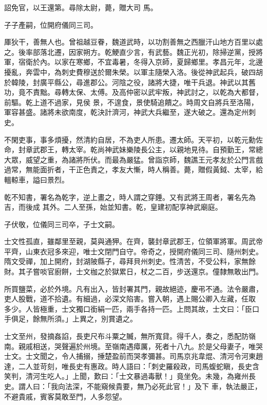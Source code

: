 \begin{pinyinscope}
 詔免官，以王還第。尋除太尉，薨，贈大司
 馬。



 子子產嗣，位開府儀同三司。



 厙狄干，善無人也。曾祖越豆眷，魏道武時，以功割善無之西臘汗山地方百里以處之。後率部落北遷，因家朔方。乾鯁直少言，有武藝。魏正光初，除掃逆黨，授將軍，宿衛於內。以家在寒鄉，不宜毒暑，冬得入京師，夏歸鄉里。孝昌元年，北邊擾亂，奔雲中，為刺史費穆送於爾朱榮。以軍主隨榮入洛。後從神武起兵，破四胡於韓陵，封廣平縣公，尋進郡公。河陰之役，諸將大捷，唯干兵退。神武以其舊功，竟不責黜。尋轉太保、太傅。及高仲密以武牢叛，神武討之，以乾為大都督，前驅。乾上道不過家，見侯
 景，不遑食，景使騎追饋之。時周文自將兵至洛陽，軍容甚盛。諸將未欲南度，乾決計濟河，神武大兵繼至，遂大破之。還為定州刺史。



 不閑吏事，事多煩擾，然清約自居，不為吏人所患。遷太師。天平初，以乾元勳佐命，封章武郡王，轉太宰。乾尚神武妹樂陵長公主，以親地見待。自預勤王，常總大眾，威望之重，為諸將所伏。而最為嚴猛。曾詣京師，魏譙王元孝友於公門言戲過常，無能面折者，干正色責之，孝友大慚，時人稱善。薨，贈假黃鉞、太宰，給轀輬車，謚曰景烈。



 乾不知書，署名為乾字，逆上畫之，時人謂之穿錘。又有武將王周者，署名先為吉，而後成
 其外。二人至孫，始並知書。乾，皇建初配享神武廟庭。



 子伏敬，位儀同三司卒，子士文嗣。



 士文性孤直，雖鄰里至親，莫與通狎。在齊，襲封章武郡王，位領軍將軍。周武帝平齊，山東衣冠多來迎，唯士文閉門自守。帝奇之，授開府儀同三司、隨州刺史。隋文受禪，加上開府，封湖陂縣子，尋拜貝州刺史。性清苦，不受公料，家無餘財。其子嘗啖官廚餅，士文枷之於獄累日，杖之二百，步送還京。僮隸無敢出門。



 所買鹽菜，必於外境。凡有出入，皆封署其門，親故絕迹，慶弔不通。法令嚴肅，吏人股戰，道不拾遺。有細過，必深文陷害。嘗入朝，遇上賜公卿入左藏，任取
 多少。人皆極重，士文獨口銜絹一匹，兩手各持一匹。上問其故，士文曰：「臣口手俱足，餘無所須。」上異之，別賞遺之。



 士文至州，發摘姦諂，長吏尺布斗粟之贓，無所寬貸。得千人，奏之，悉配防嶺南。親戚相送，哭聲遍於州境。至嶺南遇瘴厲，死者十八九。於是父母妻子，唯哭士文。士文聞之，令人捕搦，捶楚盈前而哭孝彌甚。司馬京兆韋焜、清河令河東趙達，二人並苛刻，唯長史有惠政。時人語曰：「刺史羅殺政，司馬蝮蛇瞋，長史含笑判，清河生吃人。」上聞，歎曰：「士文暴過毒獸！」竟坐免。未幾，為雍州長史。謂人曰：「我向法深，不能窺候貴要，無乃必死此官！」及下
 車，執法嚴正，不避貴戚，賓客莫敢至門，人多怨望。




\end{pinyinscope}
